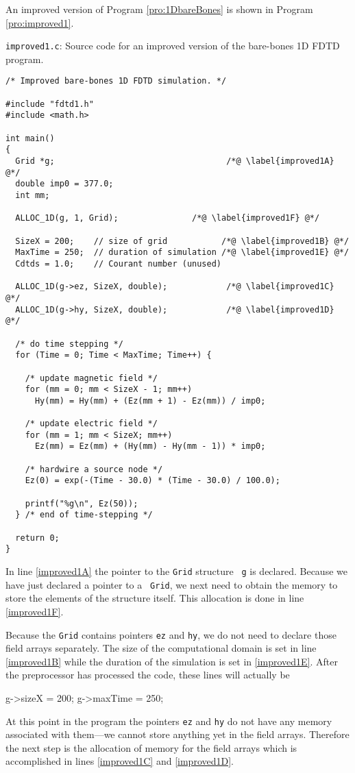 An improved version of Program \ref{pro:1DbareBones} is shown in
Program \ref{pro:improved1}.
\begin{program} {\tt improved1.c}: Source code for an improved version
  of the bare-bones 1D FDTD program. \label{pro:improved1} \codemiddle
\begin{lstlisting}
/* Improved bare-bones 1D FDTD simulation. */

#include "fdtd1.h"
#include <math.h>

int main()
{
  Grid *g;                                   /*@ \label{improved1A} @*/
  double imp0 = 377.0; 
  int mm;

  ALLOC_1D(g, 1, Grid);               /*@ \label{improved1F} @*/

  SizeX = 200;    // size of grid           /*@ \label{improved1B} @*/
  MaxTime = 250;  // duration of simulation /*@ \label{improved1E} @*/
  Cdtds = 1.0;    // Courant number (unused)

  ALLOC_1D(g->ez, SizeX, double);            /*@ \label{improved1C} @*/
  ALLOC_1D(g->hy, SizeX, double);            /*@ \label{improved1D} @*/

  /* do time stepping */
  for (Time = 0; Time < MaxTime; Time++) { 

    /* update magnetic field */
    for (mm = 0; mm < SizeX - 1; mm++)           
      Hy(mm) = Hy(mm) + (Ez(mm + 1) - Ez(mm)) / imp0;

    /* update electric field */
    for (mm = 1; mm < SizeX; mm++)
      Ez(mm) = Ez(mm) + (Hy(mm) - Hy(mm - 1)) * imp0;

    /* hardwire a source node */
    Ez(0) = exp(-(Time - 30.0) * (Time - 30.0) / 100.0);

    printf("%g\n", Ez(50));
  } /* end of time-stepping */

  return 0;
}
\end{lstlisting}
\end{program}
In line \ref{improved1A} the pointer to the {\tt Grid} structure {\tt
  g} is declared.  Because we have just declared a pointer to a {\tt
  Grid}, we next need to obtain the memory to store the elements of
the structure itself.  This allocation is done in line \ref{improved1F}.

Because the {\tt Grid} contains pointers {\tt ez} and {\tt hy}, we do
not need to declare those field arrays separately.  The size of the
computational domain is set in line \ref{improved1B} while the
duration of the simulation is set in \ref{improved1E}.  After the
preprocessor has processed the code, these lines will actually be
\begin{code}
  g->sizeX = 200;
  g->maxTime = 250;
\end{code}
At this point in the program the pointers {\tt ez} and {\tt hy} do not
have any memory associated with them---we cannot store anything yet in
the field arrays.  Therefore the next step is the allocation of memory
for the field arrays which is accomplished in lines \ref{improved1C}
and \ref{improved1D}.

